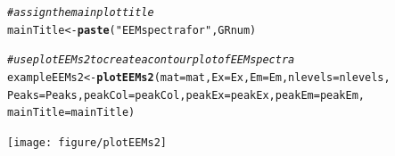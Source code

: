 \documentclass[a4paper,11pt]{article}\usepackage[]{graphicx}\usepackage[]{color}
\makeatletter
\newcommand{\hlstr}[1]{\textcolor[rgb]{0.192,0.494,0.8}{#1}}%
\newcommand{\hlcom}[1]{\textcolor[rgb]{0.678,0.584,0.686}{\textit{#1}}}%
\newcommand{\hlstd}[1]{\textcolor[rgb]{0.345,0.345,0.345}{#1}}%
\newcommand{\hlkwb}[1]{\textcolor[rgb]{0.69,0.353,0.396}{#1}}%
\newcommand{\hlkwc}[1]{\textcolor[rgb]{0.333,0.667,0.333}{#1}}%
\newcommand{\hlkwd}[1]{\textcolor[rgb]{0.737,0.353,0.396}{\textbf{#1}}}%
\newenvironment{kframe}{%
 \def\at@end@of@kframe{}%
 \ifinner\ifhmode%
  \def\at@end@of@kframe{\end{minipage}}%
  \begin{minipage}{\columnwidth}%
 \fi\fi%
 \def\FrameCommand##1{\hskip\@totalleftmargin \hskip-\fboxsep
 \colorbox{shadecolor}{##1}\hskip-\fboxsep
     \hskip-\linewidth \hskip-\@totalleftmargin \hskip\columnwidth}%
 \MakeFramed {\advance\hsize-\width
   \@totalleftmargin\z@ \linewidth\hsize
   \@setminipage}}%
 {\par\unskip\endMakeFramed%
 \at@end@of@kframe}
\newenvironment{knitrout}{}{} %
\makeatother
\begin{document}
\begin{knitrout}
\begin{kframe}
\begin{alltt}
\hlcom{# assign the main plot title}
\hlstd{mainTitle} \hlkwb{<-} \hlkwd{paste}\hlstd{(}\hlstr{"EEM spectra for"}\hlstd{, GRnum)}

\hlcom{# use plotEEMs2 to create a contour plot of EEM spectra}
\hlstd{exampleEEMs2} \hlkwb{<-} \hlkwd{plotEEMs2}\hlstd{(}\hlkwc{mat} \hlstd{= mat,} \hlkwc{Ex} \hlstd{= Ex,} \hlkwc{Em} \hlstd{= Em,} \hlkwc{nlevels} \hlstd{= nlevels,}
    \hlkwc{Peaks} \hlstd{= Peaks,} \hlkwc{peakCol} \hlstd{= peakCol,} \hlkwc{peakEx} \hlstd{= peakEx,} \hlkwc{peakEm} \hlstd{= peakEm,}
    \hlkwc{mainTitle} \hlstd{= mainTitle)}
\end{alltt}
\end{kframe}
\texttt{[image: figure/plotEEMs2]} 

\end{knitrout}
\end{document}
